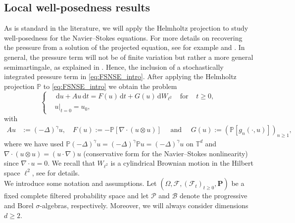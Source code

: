 \documentclass[11pt, a4paper,oneside, reqno]{amsart}
\theoremstyle{remark} %
\theoremstyle{definition} %
\numberwithin{theorem}{section}
\numberwithin{equation}{section}
\renewcommand{\P}{{\mathbb P}}
\newcommand{\Om}{\Omega}
\newcommand{\T}{\mathbb{T}}
\newcommand{\mc}{\mathcal}
\newcommand{\del}{\Delta}
\newcommand{\grad}{\nabla}
\newcommand{\gam}{\gamma}
\newcommand{\dd}{\hspace{2pt}\mathrm{d}}
\begin{document}
\subsection{Local well-posedness results}\label{subsec:LWP} As is standard in the literature, we will apply the Helmholtz projection to study well-posedness for the Navier--Stokes equations. For more details on recovering the pressure from a solution of the projected equation, see for example \cite[Chapter 5]{robinson2016three} and \cite[Proposition 3.3]{crisan2022solution}. In general, the pressure term will not be of finite variation but rather a more general semimartingale, as explained in \cite[Section 3c]{street2021semi}. Hence, the inclusion of a stochastically integrated pressure term in \eqref{eq:FSNSE_intro}. After applying the Helmholtz projection $\P$ to \eqref{eq:FSNSE_intro} we obtain the  problem
\begin{equation}\label{eq:abstract_eq}
       \left\{
        \begin{aligned}
            &\dd u + A u \dd t = F(u)\dd t + G(u)\dd W_{\ell^2}&\text{ for }&t\geq 0,\\
            &u|_{t=0}=u_0,
        \end{aligned}
        \right.
\end{equation}
with 
\begin{equation*}
    \begin{aligned}
        Au&:= (-\del)^\gam u,\quad F(u):=-\P [\grad \cdot (u\otimes u)]\quad \text{ and }\quad G(u):= (\P[g_n(\cdot, u)])_{n\geq1},
    \end{aligned}
\end{equation*}
where we have used $\P (-\del)^\gam u = (-\del)^\gam \P u = (-\del)^\gam u$ on $\T^d$ and $\grad \cdot (u\otimes u) = (u\cdot \grad)u$ (conservative form for the Navier--Stokes nonlinearity) since $\grad\cdot u =0$. We recall that $W_{\ell^2}$ is a cylindrical Brownian motion in the Hilbert space $\ell^2$, see \cite[Section 2.6]{AV25_survey} for details.\\

We introduce some notation and assumptions. Let $(\Om, \mc{F}, (\mc{F}_t)_{t\geq 0}, \mathbf{P})$ be a fixed  complete filtered probability space and let $\mc{P}$ and $\mc{B}$ denote the progressive and Borel $\sigma$-algebras, respectively. Moreover, we will always consider dimensions $d\geq 2$.
\end{document}
